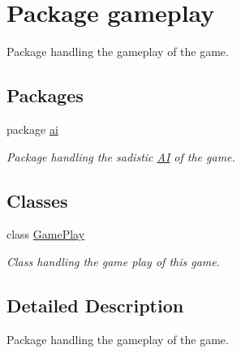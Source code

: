 \hypertarget{namespacegameplay}{\section{Package gameplay}
\label{namespacegameplay}
}


Package handling the gameplay of the game.  


\subsection*{Packages}
\begin{DoxyCompactItemize}
\item 
package \hyperlink{namespacegameplay_1_1ai}{ai}
\begin{DoxyCompactList}\small\item\em Package handling the sadistic \hyperlink{classgameplay_1_1ai_1_1_a_i}{A\-I} of the game. \end{DoxyCompactList}\end{DoxyCompactItemize}
\subsection*{Classes}
\begin{DoxyCompactItemize}
\item 
class \hyperlink{classgameplay_1_1_game_play}{Game\-Play}
\begin{DoxyCompactList}\small\item\em Class handling the game play of this game. \end{DoxyCompactList}\end{DoxyCompactItemize}


\subsection{Detailed Description}
Package handling the gameplay of the game. 
